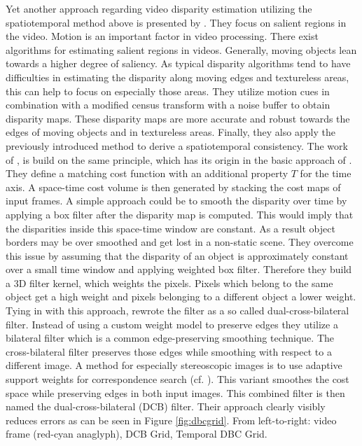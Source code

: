 \noindent Yet another approach regarding video disparity estimation utilizing the spatiotemporal method above is presented by \citeauthor{lee2012local} \citep{lee2012local}.
They focus on salient regions in the video.
Motion is an important factor in video processing.
There exist algorithms for estimating salient regions in videos.
Generally, moving objects lean towards a higher degree of saliency.
As typical disparity algorithms tend to have difficulties in estimating the disparity along moving edges and textureless areas, this can help to focus on especially those areas.
They utilize motion cues in combination with a modified census transform with a noise buffer to obtain disparity maps.
These disparity maps are more accurate and robust towards the edges of moving objects and in textureless areas.
Finally, they also apply the previously introduced method to derive a spatiotemporal consistency.
\newline\newline\noindent The work of \citeauthor{richardt2010real} \citep{richardt2010real}, \citeauthor{hosni2012temporally} \citep{hosni2012temporally} is build on the same principle, which has its origin in the basic approach of \citeauthor{davis2003spacetime} \citep{davis2003spacetime}.
They define a matching cost function with an additional property $T$ for the time axis.
A space-time cost volume is then generated by stacking the cost maps of input frames.
A simple approach could be to smooth the disparity over time by applying a box filter after the disparity map is computed.
This would imply that the disparities inside this space-time window are constant.
As a result object borders may be over smoothed and get lost in a non-static scene.
They overcome this issue by assuming that the disparity of an object is approximately constant over a small time window and applying weighted box filter.
Therefore they build a 3D filter kernel, which weights the pixels.
Pixels which belong to the same object get a high weight and pixels belonging to a different object a lower weight.
Tying in with this approach, \citeauthor{richardt2010real} \citep{richardt2010real} rewrote the filter as a so called dual-cross-bilateral filter.
Instead of using a custom weight model to preserve edges they utilize a bilateral filter which is a common edge-preserving smoothing technique.
The cross-bilateral filter preserves those edges while smoothing with respect to a different image.
A method for especially stereoscopic images is to use adaptive support weights for correspondence search (cf. \citep{yoon2006adaptive}).
This variant smoothes the cost space while preserving edges in both input images.
This combined filter is then named the dual-cross-bilateral (DCB) filter.
Their approach clearly visibly reduces errors as can be seen in Figure \ref{fig:dbcgrid}.
From left-to-right: video frame (red-cyan anaglyph), DCB Grid, Temporal DBC Grid.

